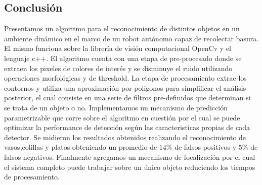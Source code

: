 	
\subsection{Conclusi\'on}
Presentamos un algoritmo para el reconocimiento de distintos objetos en 
un ambiente dinámico en el marco de un robot autónomo capaz de 
recolectar basura. El mismo funciona sobre la librería de visión 
computacional OpenCv y el lenguaje c++.  El algoritmo cuenta
con una etapa de pre-procesado donde se extraen los pixeles de colores de interés y se disminuye el ruido utilizando 
operaciones morfológicas y de threshold. La etapa de procesamiento extrae los contornos y utiliza una aproximación por polígonos
para simplificar el análisis posterior, el cual consiste en una serie de filtros pre-definidos que determinan si se trata de un objeto o no. 
Implementamos un mecanismo de predicción parametrizable que corre sobre el algoritmo 
en cuestión por el cual se puede optimizar la performance de 
detección según las caracteristicas propias de cada detector. Se 
midieron los resultados obtenidos realizando el reconocimiento de 
vasos,colillas y platos obteniendo un promedio de $14\%$ de falsos 
positivos  y $5\%$ de falsos negativos. Finalmente agregamos un mecanismo de focalización por el cual 
el sistema completo puede trabajar sobre un único objeto reduciendo 
los tiempos de procesamiento. 


